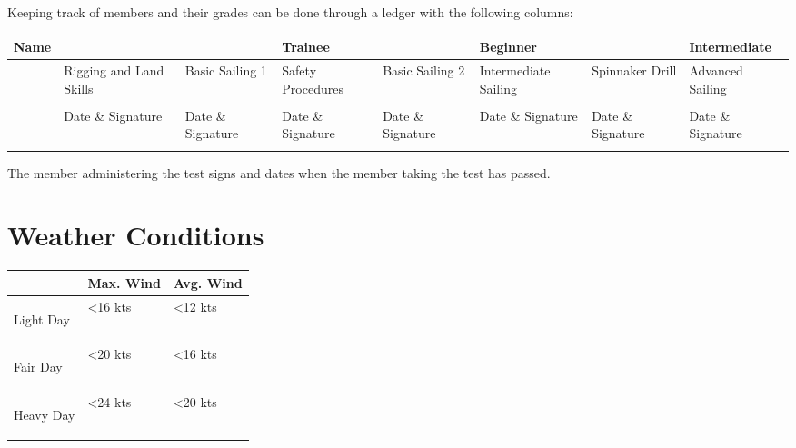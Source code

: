 \documentclass[12pt]{scrartcl}
\begin{document}
\begin{landscape}

Keeping track of members and their grades can be done through a ledger with the following columns:

\label{tab:ledger}
\begin{tabularx}{670pt}{|X|X|X|X|X|X|X|X|}
	\hline
	Name & & & Trainee & & Beginner & & Intermediate \\
	\hline
	& Rigging and \newline Land Skills & Basic \newline Sailing 1 & Safety \newline Procedures & Basic \newline Sailing 2 & Intermediate Sailing & Spinnaker Drill & Advanced Sailing \\
	& & & & & & & \\
	& Date \& \newline Signature &  Date \& \newline Signature & Date \& \newline Signature & Date \& \newline Signature & Date \& \newline Signature & Date \& \newline Signature & Date \& \newline Signature \\
	\hline
	& & & & & & & \\
\end{tabularx}

The member administering the test signs and dates when the member taking the test has passed.

\end{landscape}

\section{Weather Conditions} \label{sec:weather conditions}

\label{tab:weather conditions}
\begin{tabularx}{\textwidth}{|X|X|X|}
	\hline
	& Max. Wind & Avg. Wind \\
	\hline
	\hypertarget{condition:light day}{Light Day} & \textless 16 kts & \textless 12 kts \\
	\hline
	\hypertarget{condition:fair day}{Fair Day} & \textless 20 kts & \textless 16 kts \\
	\hline
	\hypertarget{condition:heavy day}{Heavy Day} & \textless 24 kts & \textless 20 kts \\
	\hline
\end{tabularx}
\end{document}
